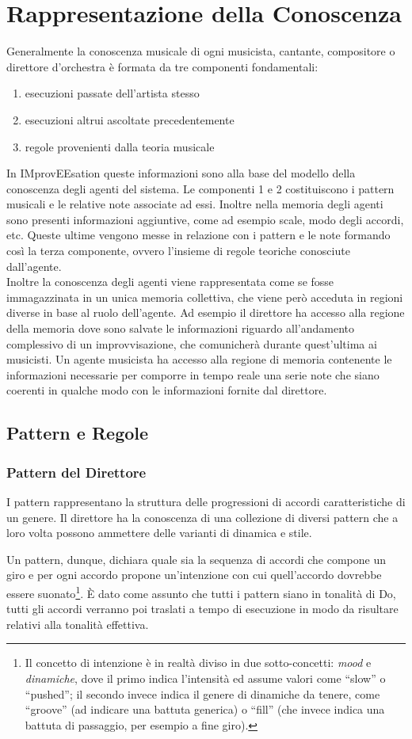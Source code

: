 \section{Rappresentazione della Conoscenza}
Generalmente la conoscenza musicale di ogni musicista, cantante,
compositore o direttore d'orchestra è formata da tre 
componenti fondamentali:
\begin{enumerate}
\item esecuzioni passate dell'artista stesso
\item esecuzioni altrui ascoltate precedentemente
\item regole provenienti dalla teoria musicale
\end{enumerate}

In IMprovEEsation queste informazioni sono alla base del modello della
conoscenza degli agenti del sistema. Le componenti 1 e 2 costituiscono i
pattern musicali e le relative note associate ad essi. Inoltre nella memoria
degli agenti sono presenti informazioni aggiuntive, come ad esempio
scale, modo degli accordi, etc. Queste ultime vengono messe in relazione
con i pattern e le note formando così la terza componente, ovvero l'insieme 
di regole teoriche conosciute dall'agente.\\ 
Inoltre la conoscenza degli agenti viene rappresentata come se fosse 
immagazzinata in un unica memoria collettiva, che viene però acceduta in
regioni diverse in base al ruolo dell'agente. Ad esempio il direttore ha
accesso alla regione della memoria dove sono salvate le informazioni
riguardo all'andamento complessivo di un improvvisazione, che comunicherà
durante quest'ultima ai musicisti. Un agente musicista ha accesso alla
regione di memoria contenente le informazioni necessarie per comporre
in tempo reale una serie note che siano coerenti in qualche modo con le
informazioni fornite dal direttore.
\subsection{Pattern e Regole}
\subsubsection*{Pattern del Direttore}
\label{sec:pattern}
I pattern rappresentano la struttura delle progressioni di accordi caratteristiche di un genere.
Il direttore ha la conoscenza di una collezione di diversi pattern che
a loro volta possono ammettere delle varianti di dinamica e stile.

Un pattern, dunque, dichiara quale sia la sequenza di accordi che compone un giro e per ogni accordo propone un'intenzione con cui quell'accordo dovrebbe essere suonato\footnote{Il concetto di intenzione è in realtà diviso in due sotto-concetti: \emph{mood} e \emph{dinamiche}, dove il primo indica l'intensità ed assume valori come ``slow'' o ``pushed''; il secondo invece indica il genere di dinamiche da tenere, come ``groove'' (ad indicare una battuta generica) o ``fill'' (che invece indica una battuta di passaggio, per esempio a fine giro).}. \`E dato come assunto che tutti i pattern siano in tonalità di Do, tutti gli accordi verranno poi traslati a tempo di esecuzione in modo da risultare relativi alla tonalità effettiva.

